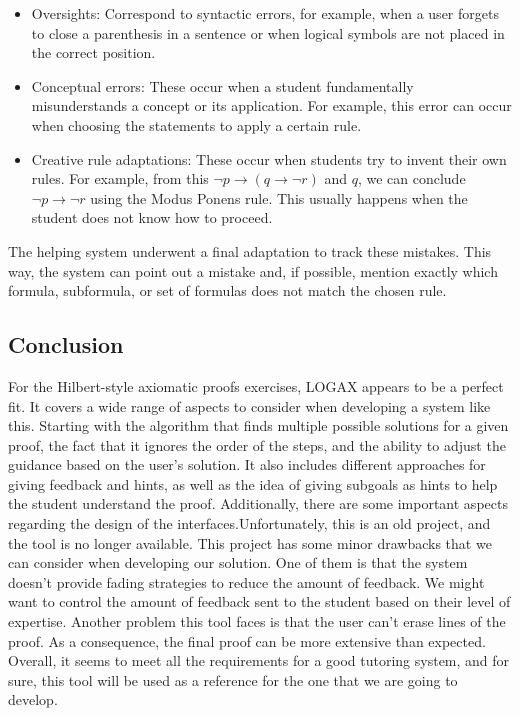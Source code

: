 \begin{itemize}
    \item Oversights: Correspond to syntactic errors, for example, when a user forgets to close a parenthesis in a sentence or when logical symbols are not placed in the correct position.
    \item Conceptual errors: These occur when a student fundamentally misunderstands a concept or its application. For example, this error can occur when choosing the statements to apply a certain rule.
    \item Creative rule adaptations: These occur when students try to invent their own rules. For example, from this \( \neg p \to (q \to \neg r) \) and \( q \), we can conclude \( \neg p \to \neg r \) using the Modus Ponens rule. This usually happens when the student does not know how to proceed.
\end{itemize}

The helping system underwent a final adaptation to track these mistakes. This way, the system can point out a mistake and, if possible, mention exactly which formula, subformula, or set of formulas does not match the chosen rule.

\subsection{Conclusion}

For the Hilbert-style axiomatic proofs exercises, LOGAX appears to be a perfect fit. It covers a wide range of aspects to consider when developing a system like this. Starting with the algorithm that finds multiple possible solutions for a given proof, the fact that it ignores the order of the steps, and the ability to adjust the guidance based on the user's solution. It also includes different approaches for giving feedback and hints, as well as the idea of giving subgoals as hints to help the student understand the proof. Additionally, there are some important aspects regarding the design of the interfaces.Unfortunately, this is an old project, and the tool is no longer available. This project has some minor drawbacks that we can consider when developing our solution. One of them is that the system doesn't provide fading strategies to reduce the amount of feedback. We might want to control the amount of feedback sent to the student based on their level of expertise. Another problem this tool faces is that the user can't erase lines of the proof. As a consequence, the final proof can be more extensive than expected. Overall, it seems to meet all the requirements for a good tutoring system, and for sure, this tool will be used as a reference for the one that we are going to develop.

